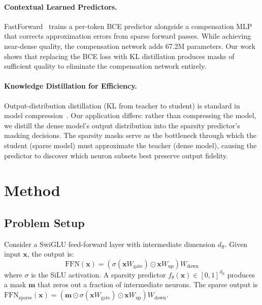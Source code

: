 \documentclass[11pt,a4paper]{article}
\begin{document}
\paragraph{Contextual Learned Predictors.}
FastForward~\cite{sun2024fastforward} trains a per-token BCE predictor alongside a compensation MLP that corrects approximation errors from sparse forward passes.
While achieving near-dense quality, the compensation network adds 67.2M parameters.
Our work shows that replacing the BCE loss with KL distillation produces masks of sufficient quality to eliminate the compensation network entirely.

\paragraph{Knowledge Distillation for Efficiency.}
Output-distribution distillation (KL from teacher to student) is standard in model compression~\cite{hinton2015distilling,sanh2019distilbert}.
Our application differs: rather than compressing the model, we distill the dense model's output distribution into the sparsity predictor's masking decisions.
The sparsity masks serve as the bottleneck through which the student (sparse model) must approximate the teacher (dense model), causing the predictor to discover which neuron subsets best preserve output fidelity.

\section{Method}

\subsection{Problem Setup}

Consider a SwiGLU feed-forward layer with intermediate dimension $d_{\text{ff}}$. Given input $\mathbf{x}$, the output is:
\begin{equation}
\text{FFN}(\mathbf{x}) = (\sigma(\mathbf{x} W_{\text{gate}}) \odot \mathbf{x} W_{\text{up}}) W_{\text{down}}
\end{equation}
where $\sigma$ is the SiLU activation.
A sparsity predictor $f_\theta(\mathbf{x}) \in [0,1]^{d_{\text{ff}}}$ produces a mask $\mathbf{m}$ that zeros out a fraction of intermediate neurons.
The sparse output is $\text{FFN}_{\text{sparse}}(\mathbf{x}) = (\mathbf{m} \odot \sigma(\mathbf{x} W_{\text{gate}}) \odot \mathbf{x} W_{\text{up}}) W_{\text{down}}$.
\end{document}
